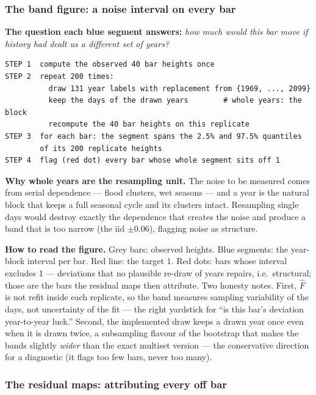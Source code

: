 \documentclass[11pt]{article}
\begin{document}
\subsubsection{The band figure: a noise interval on every bar}
\label{sec:pitband}

\textbf{The question each blue segment answers:} \emph{how much would this
bar move if history had dealt us a different set of years?}

\begin{Verbatim}[fontsize=\small]
STEP 1  compute the observed 40 bar heights once
STEP 2  repeat 200 times:
          draw 131 year labels with replacement from {1969, ..., 2099}
          keep the days of the drawn years        # whole years: the block
          recompute the 40 bar heights on this replicate
STEP 3  for each bar: the segment spans the 2.5% and 97.5% quantiles
        of its 200 replicate heights
STEP 4  flag (red dot) every bar whose whole segment sits off 1
\end{Verbatim}

\textbf{Why whole years are the resampling unit.} The noise to be measured
comes from serial dependence --- flood clusters, wet seasons --- and a year is
the natural block that keeps a full seasonal cycle and its clusters intact.
Resampling single days would destroy exactly the dependence that creates the
noise and produce a band that is too narrow (the iid $\pm 0.06$), flagging
noise as structure.

\textbf{How to read the figure.} Grey bars: observed heights. Blue segments:
the year-block interval per bar. Red line: the target 1. Red dots: bars
whose interval excludes 1 --- deviations that no plausible re-draw of years
repairs, i.e.\ structural; those are the bars the residual maps then
attribute. Two honesty notes. First, $\hat F$ is not refit inside each
replicate, so the band measures sampling variability of the days, not
uncertainty of the fit --- the right yardstick for ``is this bar's deviation
year-to-year luck.'' Second, the implemented draw keeps a drawn year once
even when it is drawn twice, a subsampling flavour of the bootstrap that
makes the bands slightly \emph{wider} than the exact multiset version --- the
conservative direction for a diagnostic (it flags too few bars, never too
many).

\subsubsection{The residual maps: attributing every off bar}
\label{sec:pitmaps}
\end{document}
